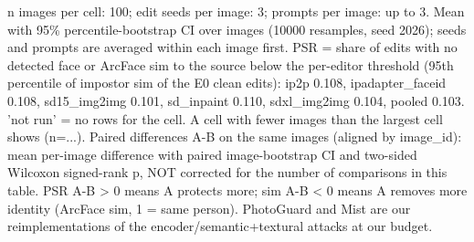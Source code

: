 \begin{table}[t]
{}
\caption{E2: PhotoGuard and Mist vs noise control and v1}
\label{tab:e2}
\par\footnotesize n images per cell: 100; edit seeds per image: 3; prompts per image: up to 3. Mean with 95\% percentile-bootstrap CI over images (10000 resamples, seed 2026); seeds and prompts are averaged within each image first. PSR = share of edits with no detected face or ArcFace sim to the source below the per-editor threshold (95th percentile of impostor sim of the E0 clean edits): ip2p 0.108, ipadapter\_faceid 0.108, sd15\_img2img 0.101, sd\_inpaint 0.110, sdxl\_img2img 0.104, pooled 0.103. 'not run' = no rows for the cell. A cell with fewer images than the largest cell shows (n=...). Paired differences A-B on the same images (aligned by image\_id): mean per-image difference with paired image-bootstrap CI and two-sided Wilcoxon signed-rank p, NOT corrected for the number of comparisons in this table. PSR A-B > 0 means A protects more; sim A-B < 0 means A removes more identity (ArcFace sim, 1 = same person). PhotoGuard and Mist are our reimplementations of the encoder/semantic+textural attacks at our budget.
\end{table}
